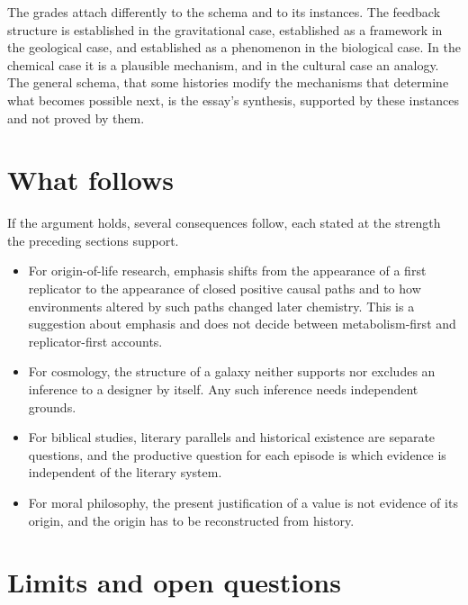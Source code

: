 \documentclass[11pt]{article}
\begin{document}
The grades attach differently to the schema and to its instances. The feedback structure is established in the gravitational case, established as a framework in the geological case, and established as a phenomenon in the biological case. In the chemical case it is a plausible mechanism, and in the cultural case an analogy. The general schema, that some histories modify the mechanisms that determine what becomes possible next, is the essay's synthesis, supported by these instances and not proved by them.

\section{What follows}

If the argument holds, several consequences follow, each stated at the strength the preceding sections support.
\begin{itemize}
\item For origin-of-life research, emphasis shifts from the appearance of a first replicator to the appearance of closed positive causal paths and to how environments altered by such paths changed later chemistry. This is a suggestion about emphasis and does not decide between metabolism-first and replicator-first accounts.
\item For cosmology, the structure of a galaxy neither supports nor excludes an inference to a designer by itself. Any such inference needs independent grounds.
\item For biblical studies, literary parallels and historical existence are separate questions, and the productive question for each episode is which evidence is independent of the literary system.
\item For moral philosophy, the present justification of a value is not evidence of its origin, and the origin has to be reconstructed from history.
\end{itemize}

\section{Limits and open questions}
\end{document}
